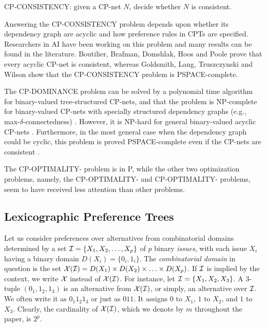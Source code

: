 \begin{definition}
\label{def:con}
  CP-CONSISTENCY: given a CP-net $N$, decide whether 
	$N$ is consistent.
\end{definition}

Answering the CP-CONSISTENCY problem depends upon whether
its dependency graph are acyclic and how preference rules
in CPTs are specified.
Researchers in AI have been working on this problem
and many results can be found in the literature.
Boutilier, Brafman, Domshlak, Hoos and Poole \cite{bbdh03} 
prove that every acyclic CP-net
is consistent, whereas Goldsmith, Lang, Truszczynski and Wilson \cite{Goldsmith} show
that the CP-CONSISTENCY problem is PSPACE-complete.



The CP-DOMINANCE problem can be solved by
a polynomial time algorithm for binary-valued tree-structured
CP-nets, and that the problem is NP-complete for binary-valued
CP-nets with specially structured dependency graphs 
(e.g., max-$\delta$-connectedness) \cite{bbdh03}.
However, it is NP-hard for general binary-valued acyclic 
CP-nets \cite{bbdh03}.
Furthermore, in the most general case when the dependency graph
could be cyclic, this problem is proved PSPACE-complete even
if the CP-nets are consistent \cite{Goldsmith}.

The CP-OPTIMALITY- problem is in P, while
the other two optimization problems, namely, the CP-OPTIMALITY-
and CP-OPTIMALITY- problems, seem to have received 
less attention than other problems.



\subsection{Lexicographic Preference Trees \label{sec:LPT}}
Let us consider preferences over alternatives from combinatorial domains 
determined by a set $\mathcal{I} = \{X_1, X_2, \ldots, X_p\}$ of $p$ binary 
\emph{issues}, with each issue
$X_i$ having a binary domain $D(X_i) = \{0_i, 1_i\}$. The 
\emph{combinatorial domain} in question is the set $\mathcal{X}(\mathcal{I})=D(X_1) \times 
D(X_2) \times \ldots\times D(X_p)$. If $\mathcal{I}$ is implied by the context, 
we write $\mathcal{X}$ instead of $\mathcal{X}(\mathcal{I})$. For instance, let $\mathcal{I} = \{X_1, X_2, 
X_3\}$. A 3-tuple $(0_1,1_2,1_3)$ is an alternative from $\mathcal{X}(\mathcal{I})$,
or simply, an alternative over $\mathcal{I}$. We 
often write it as $0_1 1_2 1_3$ or just as $011$. It assigns $0$ to 
$X_1$, $1$ to $X_2$, and $1$ to $X_3$.  
Clearly, the cardinality of 
$\mathcal{X}(\mathcal{I})$, which we denote by $m$ throughout the paper, is $2^p$. 

